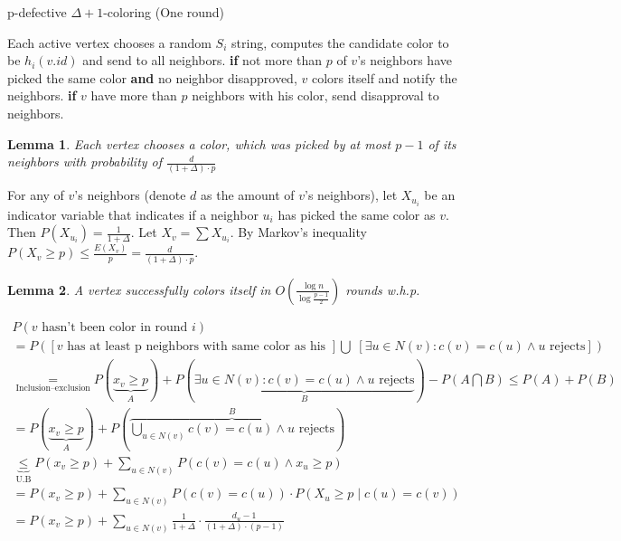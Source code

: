 \documentclass[11pt]{article}
\newtheorem{lemma}{Lemma}
\begin{document}
\begin{algorithm}
\caption{p-defective $\Delta+1$-coloring (One round)}
\begin{algorithmic}[1]
\State Each active vertex chooses a random $S_i$ string, computes the candidate color to be $h_i(v.id)$ and send to all neighbors.
    \State \textbf{if} not more than $p$ of $v$'s neighbors have picked the same color \textbf{and} no neighbor disapproved, $v$ colors itself and notify the neighbors.
\Else
    \State \textbf{if} $v$ have more than $p$ neighbors with his color, send disapproval to neighbors.
\EndIf
\end{algorithmic}
\end{algorithm}

\begin{lemma}
\label{prob_pick_good_color}
Each vertex chooses a color, which was picked by at most $p-1$ of its neighbors with probability of $\frac{d}{(1+\Delta) \cdot p}$
\end{lemma}
For any of $v$'s neighbors (denote $d$ as the amount of $v$'s neighbors), let $X_{u_i}$ be an indicator variable that indicates if a neighbor $u_i$ has picked the same color as $v$. Then $P(X_{u_i}) = \frac{1}{1 + \Delta}$. Let $X_v = \sum{X_{u_i}}$. By Markov's inequality $P(X_v \ge p) \le \frac{E(X_v)}{p} = \frac{d}{(1+\Delta) \cdot p}$.

\begin{lemma}
\label{rounds}
A vertex successfully colors itself in $O(\frac{\log{n}}{\log{\frac{p-1}{2}}})$ rounds w.h.p.
\end{lemma}

\begin{gather*}
P(v \text{ hasn't been color in round } i)\\ 
= P([v \text{ has at least p neighbors with same color as his }] \bigcup \; [\exists u\in N(v): c(v)=c(u) \land u \text{ rejects}]) \\
\underset{\text{Inclusion–exclusion}}{=} P(\underset{A}{\underbrace{x_v \ge p}}) + P(\underset{B}{\underbrace{\exists u\in N(v): c(v)=c(u) \land u \text{ rejects}}}) - P(A \bigcap B) \le P(A) + P(B) \\
= P(\underset{A}{\underbrace{x_v \ge p}}) + P(\overset{B}{\overbrace{\bigcup_{u \in N(v)} c(v)=c(u) \land u \text{ rejects}}}) \\
\underset{\text{U.B}}{\underbrace{\le}} P(x_v \ge p) + \sum_{u \in N(v)}{P(c(v)=c(u) \land x_u \ge p)} \\
=  P(x_v \ge p) + \sum_{u \in N(v)}{P(c(v)=c(u)) \cdot P(X_u \ge p \mid c(u) = c(v))} \\
= P(x_v \ge p) + \sum_{u \in N(v)}{\frac{1}{1 + \Delta} \cdot \frac{d_{u}-1}{(1+ \Delta) \cdot (p-1)} }
\end{gather*}
\end{document}
